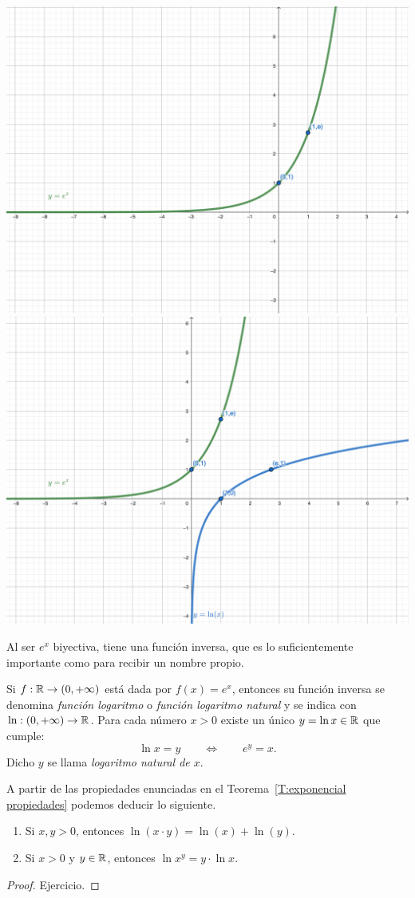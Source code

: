 \centerline{
\includegraphics[width=.45\textwidth]{pics/exponencial.png}
\hfil
\includegraphics[width=.45\textwidth]{pics/exponencial-logaritmo.png}
}

Al ser $e^x$ biyectiva, tiene una función inversa, que es lo suficientemente importante como para recibir un nombre propio.

\begin{definition}
    Si $f:\mathbb{R}\to(0,+\infty)$ está dada por $f(x) = e^x$, entonces su función inversa se denomina \emph{función logaritmo} o \emph{función logaritmo natural} y se indica con $\ln : (0,+\infty) \to \mathbb{R}$. Para cada número $x > 0$ existe un único $y=\ln x\in\mathbb{R}$ que cumple:
    \[
    \ln x = y 
    \qquad\iff\qquad
    e^y = x.
    \]
    Dicho $y$ se llama \emph{logaritmo natural de $x$}.
\end{definition}

A partir de las propiedades enunciadas en el Teorema~\ref{T:exponencial propiedades} podemos deducir lo siguiente.

\begin{proposition}\label{P:logaritmo propiedades}
        \begin{enumerate}
        \item Si $x,y>0$, entonces $\ln (x\cdot y) = \ln(x) + \ln(y)$.
        \item Si $x > 0$ y $y\in\mathbb{R}$, entonces $\ln x^y = y \cdot \ln x$.
    \end{enumerate}
\end{proposition}

\begin{proof}
Ejercicio.
\end{proof}


